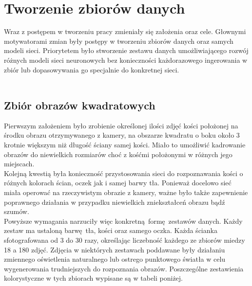
\chapter{Tworzenie zbiorów danych}

Wraz z postępem w tworzeniu pracy zmieniały się założenia oraz cele.
Głownymi motywatorami zmian były postępy w tworzeniu zbiorów danych oraz samych
modeli sieci. Priorytetem było stworzenie zestawu danych
umożliwiającego rozwój różnych modeli sieci neuronowych bez konieczności każdorazowego
ingerowania w zbiór lub dopasowywania go specjalnie do konkretnej sieci.\\\\

\section{Zbiór obrazów kwadratowych}

Pierwszym założeniem było zrobienie określonej ilości zdjęć kości położonej na środku
obrazu otrzymywanego z kamery, na obszarze kwadratu o boku około 3 krotnie większym
niż długość ściany samej kości. Miało to umożliwić kadrowanie obrazów
do niewielkich rozmiarów choć z kośćmi położonymi w różnych jego miejscach.\\
Kolejną kwestią była konieczność przystosowania sieci do rozpoznawania kości o
różnych kolorach ścian, oczek jak i samej barwy tła. Ponieważ docelowo sieć
miała operować na rzeczywistym obrazie z kamery, ważne było także zapewnienie poprawnego
działania w przypadku niewielkich zniekształceń obrazu bądź szumów.\\
Powyższe wymagania narzuciły więc konkretną formę zestawów danych.
Każdy zestaw ma ustaloną barwę tła, kości oraz samego oczka. Każda ścianka sfotografowana
od 3 do 30 razy, określając liczebność każdego ze zbiorów miedzy 18 a 180 zdjęć.
Zdjęcia w niektórych zestawach poddawane były działaniu zmiennego oświetlenia naturalnego
lub ostrego punktowego światła w celu wygenerowania trudniejszych do rozpoznania obrazów.
Poszczególne zestawienia kolorystyczne w tych zbiorach wypisane są w tabeli poniżej. \newpage

